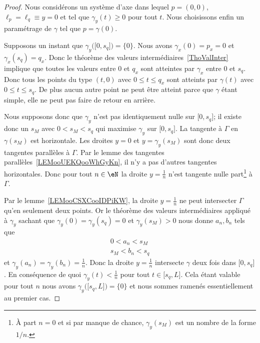 \begin{proof}
	Nous considérons un système d'axe dans lequel \( p=(0,0)\), \( \ell_p=\ell_q\equiv y=0\) et tel que \( \gamma_y(t)\geq 0\) pour tout \( t\). Nous choisissons enfin un paramétrage de \( \gamma\) tel que \( p=\gamma(0)\).

	Supposons un instant que \( \gamma_y\big( \mathopen[ 0 , s_q \mathclose] \big)=\{ 0 \}\). Nous avons \( \gamma_x(0)=p_x=0\) et \( \gamma_x(s_q)=q_x\). Donc le théorème des valeurs intermédiaires~\ref{ThoValInter} implique que toutes les valeurs entre \( 0\) et \( q_x\) sont atteintes par \( \gamma_x\) entre \( 0\) et \( s_q\). Donc tous les points du type \( (t,0)\) avec \( 0\leq t\leq q_x\) sont atteints par \(  \gamma(t) \) avec \( 0\leq t\leq s_q\). De plus aucun autre point ne peut être atteint parce que \( \gamma\) étant simple, elle ne peut pas faire de retour en arrière.

	Nous supposons donc que \( \gamma_y\) n'est pas identiquement nulle sur \( \mathopen[ 0 , s_q \mathclose]\); il existe donc un \( s_M\) avec  \( 0<s_M<s_q\) qui maximise \( \gamma_y\) sur \( \mathopen[ 0 , s_q \mathclose]\). La tangente à \( \Gamma\) en \( \gamma(s_M)\) est horizontale. Les droites \( y=0\) et \( y=\gamma_y(s_M)\) sont donc deux tangentes parallèles à \( \Gamma\). Par le lemme des tangentes parallèles~\ref{LEMooUEKQooWhGyKn}, il n'y a pas d'autres tangentes horizontales. Donc pour tout \( n\in \eN\) la droite \( y=\frac{1}{ n }\) n'est tangente nulle part\footnote{À part \( n=0\) et si par manque de chance, \( \gamma_y(s_M) \) est un nombre de la forme \( 1/n\).} à \( \Gamma\).

	Par le lemme~\ref{LEMooCSXCooIDPiKW}, la droite \( y=\frac{1}{ n }\) ne peut intersecter \( \Gamma\) qu'en seulement deux points. Or le théorème des valeurs intermédiaires appliqué à \( \gamma_y\) sachant que \( \gamma_y(0)=\gamma_y(s_q)=0\) et \( \gamma_y(s_M)>0\) nous donne \( a_n,b_n\) tels que
	\begin{subequations}
		\begin{align}
			0<a_n<s_M \\
			s_M<b_n<s_q
		\end{align}
	\end{subequations}
	et \( \gamma_y(a_n)=\gamma_y(b_n)=\frac{1}{ n }\). Donc la droite \( y=\frac{1}{ n }\) intersecte \( \gamma\) deux fois dans \( \mathopen[ 0 , s_q \mathclose]\). En conséquence de quoi \( \gamma_y(t)<\frac{1}{ n }\) pour tout \( t\in\mathopen[ s_q , L \mathclose]\). Cela étant valable pour tout \( n\) nous avons \( \gamma_y\big( \mathopen[ s_q , L \mathclose] \big)=\{ 0 \}\) et nous sommes ramenés essentiellement au premier cas.
\end{proof}

